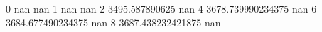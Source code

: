 0 nan nan
1 nan nan
2 3495.587890625 nan
4 3678.739990234375 nan
6 3684.677490234375 nan
8 3687.438232421875 nan

